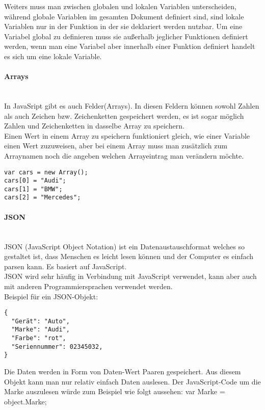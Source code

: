 Weiters muss man zwischen globalen und lokalen Variablen unterscheiden, während globale Variablen im gesamten Dokument definiert sind, sind lokale Variablen nur in der Funktion in der sie deklariert werden nutzbar. Um eine Variabel global zu definieren muss sie außerhalb jeglicher Funktionen definiert werden, wenn man eine Variabel aber innerhalb einer Funktion definiert handelt es sich um eine lokale Variable.\\

\paragraph{Arrays}\\
In JavaSript gibt es auch Felder(Arrays). In diesen Feldern können sowohl Zahlen als auch Zeichen bzw. Zeichenketten gespeichert werden, es ist sogar möglich Zahlen und Zeichenketten in dasselbe Array zu speichern.\\
Einen Wert in einem Array zu speichern funktioniert gleich, wie einer Variable einen Wert zuzuweisen, aber bei einem Array muss man zusätzlich zum Arraynamen noch die angeben welchen Arrayeintrag man verändern möchte.\\
\begin{lstlisting}
var cars = new Array();
cars[0] = "Audi";
cars[1] = "BMW";
cars[2] = "Mercedes";
\end{lstlisting}

\paragraph{JSON}\\
JSON (JavaScript Object Notation) ist ein Datenaustauschformat welches so gestaltet ist, dass Menschen es leicht lesen können und der Computer es einfach parsen kann. Es basiert auf JavaScript.\\
JSON wird sehr häufig in Verbindung mit JavaScript verwendet, kann aber auch mit anderen Programmiersprachen verwendet werden.\\
Beispiel für ein JSON-Objekt:\\
\begin{lstlisting}
{
  "Gerät": "Auto",
  "Marke": "Audi",
  "Farbe": "rot",
  "Seriennummer": 02345032,
}
\end{lstlisting}

Die Daten werden in Form von Daten-Wert Paaren gespeichert. Aus diesem Objekt kann man nur relativ einfach Daten auslesen. Der JavaScript-Code um die Marke auszulesen würde zum Beispiel wie folgt aussehen:
var Marke = object.Marke;

